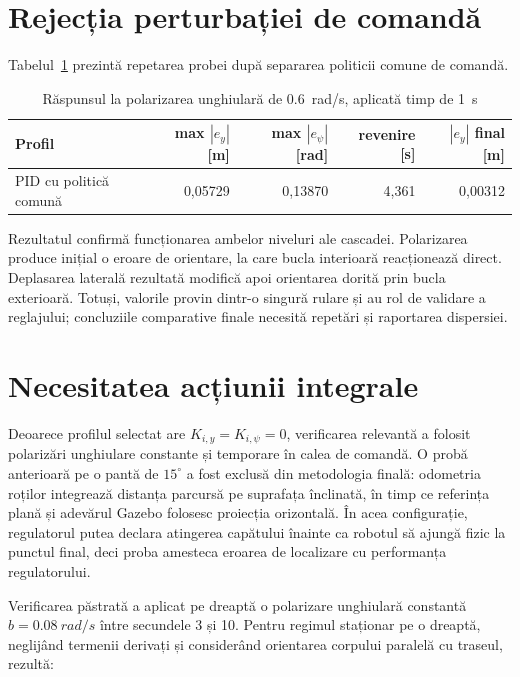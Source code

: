 \documentclass[12pt,a4paper,oneside]{report}
\begin{document}
\section{Rejecția perturbației de comandă}

Tabelul~\ref{tab:disturbance-results} prezintă repetarea probei după separarea
politicii comune de comandă.

\begin{table}[htbp]
  \centering
  \caption{Răspunsul la polarizarea unghiulară de \SI{0.6}{rad/s}, aplicată
  timp de \SI{1}{s}}
  \label{tab:disturbance-results}
  \begin{tabular}{lrrrr}
    \toprule
    Profil & max $|e_y|$ [m] & max $|e_\psi|$ [rad] & revenire [s]
      & $|e_y|$ final [m] \\
    \midrule
    PID cu politică comună & 0,05729 & 0,13870 & 4,361 & 0,00312 \\
    \bottomrule
  \end{tabular}
\end{table}

Rezultatul confirmă funcționarea ambelor niveluri ale cascadei. Polarizarea
produce inițial o eroare de orientare, la care bucla interioară reacționează
direct. Deplasarea laterală rezultată modifică apoi orientarea dorită prin bucla
exterioară. Totuși, valorile provin dintr-o singură rulare și au rol
de validare a reglajului; concluziile comparative finale necesită repetări și
raportarea dispersiei.

\section{Necesitatea acțiunii integrale}

Deoarece profilul selectat are $K_{i,y}=K_{i,\psi}=0$, verificarea relevantă a
folosit polarizări unghiulare constante și temporare în calea de comandă. O
probă anterioară pe o pantă de $15^\circ$ a fost exclusă din metodologia finală:
odometria roților integrează distanța parcursă pe suprafața înclinată, în timp
ce referința plană și adevărul Gazebo folosesc proiecția orizontală. În acea
configurație, regulatorul putea declara atingerea capătului înainte ca robotul
să ajungă fizic la punctul final, deci proba amesteca eroarea de localizare cu
performanța regulatorului.

Verificarea păstrată a aplicat pe dreaptă o polarizare unghiulară constantă
$b=\SI{0.08}{rad/s}$ între secundele 3 și 10. Pentru regimul staționar pe o
dreaptă, neglijând termenii derivați și considerând orientarea corpului paralelă
cu traseul, rezultă:
\end{document}
